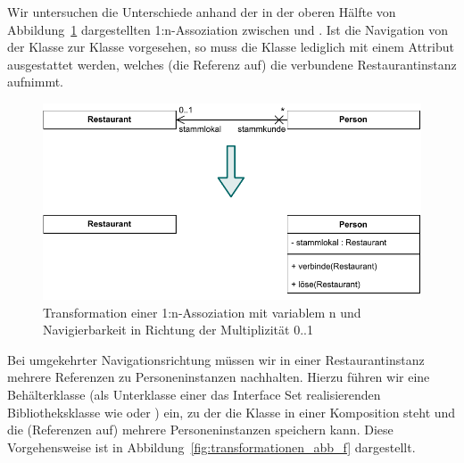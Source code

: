 \vspace{2mm} %

Wir untersuchen die Unterschiede anhand der in der oberen Hälfte von Abbildung~\ref{fig:transformationen_abb_e} dargestellten 1:n-Assoziation zwischen  und . Ist die Navigation von der Klasse  zur Klasse  vorgesehen, so muss die Klasse  lediglich mit einem Attribut  ausgestattet werden, welches (die Referenz auf) die verbundene Restaurantinstanz aufnimmt.

\begin{figure}[h!]
	\centering
	\includegraphics[scale=1.0]{Bilder/Kapitel-9/transformationen_abb_e.pdf}
	\vspace{\baselineskip} %
	\caption{Transformation einer 1:n-Assoziation mit variablem n und Navigierbarkeit in Richtung der Multiplizität 0..1}
	\label{fig:transformationen_abb_e}
\end{figure}

\pagebreak %

\minisec{~~~} %
\vspace{2mm} %

Bei umgekehrter Navigationsrichtung müssen wir in einer Restaurantinstanz mehrere Referenzen zu Personeninstanzen nachhalten. Hierzu führen wir eine Behälterklasse  (\zb als Unterklasse einer das Interface Set realisierenden Bibliotheks\-klasse wie  oder ) ein, zu der die Klasse  in einer Komposition steht und die (Referenzen auf) mehrere Personeninstanzen speichern kann. Diese Vorgehensweise ist in Abbildung~\ref{fig:transformationen_abb_f} dargestellt.

